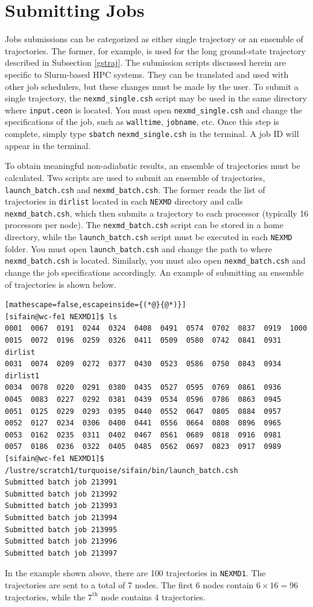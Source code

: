 \documentclass[letterpaper,12pt,titlepage]{article}
\begin{document}
\newpage
\section{Submitting Jobs}
\label{submit}
Jobs submissions can be categorized as either single trajectory or an ensemble of trajectories.  The former, for example, is used for the long ground-state trajectory described in Subsection \ref{gstraj}.  The submission scripts discussed herein are specific to Slurm-based HPC systems.  They can be translated and used with other job schedulers, but these changes must be made by the user.  To submit a single trajectory, the \verb+nexmd_single.csh+ script may be used in the same directory where \verb+input.ceon+ is located.  You must open \verb+nexmd_single.csh+ and change the specifications of the job, such as \verb+walltime+, \verb+jobname+, etc.  Once this step is complete, simply type \verb+sbatch+ \verb+nexmd_single.csh+ in the terminal.  A job ID will appear in the terminal.  

To obtain meaningful non-adiabatic results, an ensemble of trajectories must be calculated.  Two scripts are used to submit an ensemble of trajectories, \verb+launch_batch.csh+ and \verb+nexmd_batch.csh+.  The former reads the list of trajectories in \verb+dirlist+ located in each \verb+NEXMD+ directory and calls \verb+nexmd_batch.csh+, which then submits a trajectory to each processor (typically 16 processors per node).  The \verb+nexmd_batch.csh+ script can be stored in a home directory, while the \verb+launch_batch.csh+ script must be executed in each \verb+NEXMD+ folder.  You must open \verb+launch_batch.csh+ and change the path to where \verb+nexmd_batch.csh+ is located.  Similarly, you must also open \verb+nexmd_batch.csh+ and change the job specifications accordingly. An example of submitting an ensemble of trajectories is shown below.
\begin{lstlisting}[mathescape=false,escapeinside={(*@}{@*)}]
[sifain@wc-fe1 NEXMD1]$ ls
0001  0067  0191  0244  0324  0408  0491  0574  0702  0837  0919  1000
0015  0072  0196  0259  0326  0411  0509  0580  0742  0841  0931  dirlist
0031  0074  0209  0272  0377  0430  0523  0586  0750  0843  0934  dirlist1
0034  0078  0220  0291  0380  0435  0527  0595  0769  0861  0936
0045  0083  0227  0292  0381  0439  0534  0596  0786  0863  0945
0051  0125  0229  0293  0395  0440  0552  0647  0805  0884  0957
0052  0127  0234  0306  0400  0441  0556  0664  0808  0896  0965
0053  0162  0235  0311  0402  0467  0561  0689  0818  0916  0981
0057  0186  0236  0322  0405  0485  0562  0697  0823  0917  0989
[sifain@wc-fe1 NEXMD1]$ /lustre/scratch1/turquoise/sifain/bin/launch_batch.csh
Submitted batch job 213991
Submitted batch job 213992
Submitted batch job 213993
Submitted batch job 213994
Submitted batch job 213995
Submitted batch job 213996
Submitted batch job 213997
\end{lstlisting}
In the example shown above, there are 100 trajectories in \verb+NEXMD1+.  The trajectories are sent to a total of 7 nodes.  The first 6 nodes contain $6\times16=96$ trajectories, while the $7^{\text{th}}$ node contains 4 trajectories.
  
\end{document}
